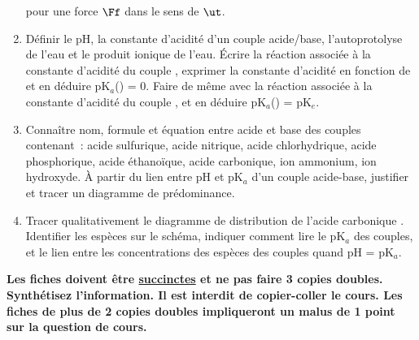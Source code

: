 \documentclass[a4paper, 12pt, final, garamond]{book}
\begin{document}
\begin{enumerate}[label=\sqenumi]
        pour une force $\Ff$ dans le sens de $\ut$.
    \item Définir le pH, la constante d'acidité d'un couple acide/base,
        l'autoprotolyse de l'eau et le produit ionique de l'eau. Écrire la
        réaction associée à la constante d'acidité du couple ,
        exprimer la constante d'acidité en fonction de \ce{[H3O+]} et en déduire
        pK$_a$() = 0. Faire de même avec la réaction associée à la
        constante d'acidité du couple , et en déduire
        pK$_a$() = pK$_e$.
    \item Connaître nom, formule et équation entre acide et base des couples
        contenant~: acide sulfurique, acide nitrique, acide chlorhydrique, acide
        phosphorique, acide éthanoïque, acide carbonique, ion ammonium, ion
        hydroxyde. À partir du lien entre pH et pK$_a$ d'un couple acide-base,
        justifier et tracer un diagramme de prédominance.

    \item Tracer qualitativement le diagramme de distribution de l'acide
        carbonique . Identifier les espèces sur le schéma, indiquer
        comment lire le pK$_a$ des couples, et le lien entre les concentrations
        des espèces des couples quand pH = pK$_a$.
\end{enumerate}
\vspace{-5pt}

\begin{framed}
    \centering\bfseries\large
    Les fiches doivent être \ul{succinctes} et ne pas faire 3 copies doubles.
    Synthétisez l'information. Il est interdit de copier-coller le cours.
    \bigbreak \Huge
    Les fiches de plus de 2 copies doubles impliqueront un malus de 1 point sur
    la question de cours.
\end{framed}
\end{document}
